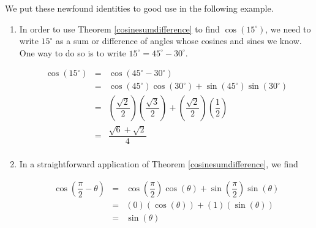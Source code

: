 We put these newfound identities to good use in the following example.

\medskip

{\begin{enumerate}

\item In order to use Theorem \ref{cosinesumdifference} to find $\cos\left(15^{\circ}\right)$, we need to write $15^{\circ}$ as a sum or difference of angles whose cosines and sines we know.  One way to do so is to write $15^{\circ} = 45^{\circ} - 30^{\circ}$.


\[ \begin{array}{rcl}

\cos\left(15^{\circ}\right) & = & \cos\left(45^{\circ} - 30^{\circ} \right) \\ [2pt]
                            & = & \cos\left(45^{\circ}\right)\cos\left(30^{\circ} \right) + \sin\left(45^{\circ}\right)\sin\left(30^{\circ} \right) \\ [2pt]
                            & = & \left( \dfrac{\sqrt{2}}{2} \right)\left( \dfrac{\sqrt{3}}{2} \right)  +  \left( \dfrac{\sqrt{2}}{2} \right)\left( \dfrac{1}{2} \right)\\ [15pt]
														& = &  \dfrac{\sqrt{6}+ \sqrt{2}}{4} \\ 
\end{array} \]

\item  In a straightforward application of  Theorem \ref{cosinesumdifference}, we find

\[ \begin{array}{rcl}

\cos\left(\dfrac{\pi}{2} - \theta\right) & = & \cos\left(\dfrac{\pi}{2}\right)\cos\left(\theta\right) + \sin\left(\dfrac{\pi}{2}\right)\sin\left(\theta \right) \\ [10pt]
                            & = & \left( 0 \right)\left( \cos(\theta) \right)  +  \left( 1 \right)\left( \sin(\theta) \right) \\ [4pt]
														& = & \sin(\theta)    \\
\end{array} \]


\end{enumerate}
}

